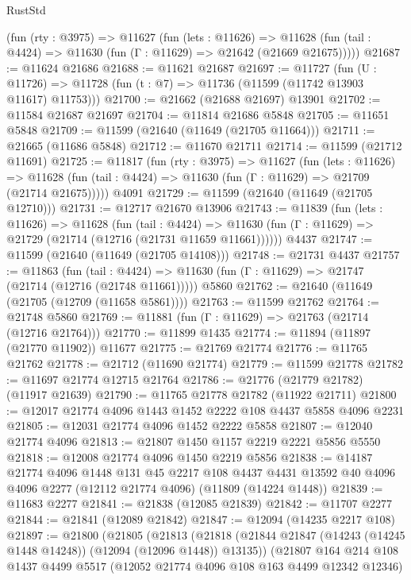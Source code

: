 \begin{lexlean}{RustStd}
\begin{coremodule}
    (fun (rty : @3975) =>
    @11627
      (fun (lets : @11626) =>
      @11628 (fun (tail : @4424) => @11630 (fun (Γ : @11629) => @21642 (@21669 @21675)))))
@21687 := @11624 @21686
@21688 := @11621 @21687
@21697 := @11727
    (fun (U : @11726) => @11728 (fun (t : @7) => @11736 (@11599 (@11742 @13903 @11617) @11753)))
@21700 := @21662 (@21688 @21697) @13901
@21702 := @11584 @21687 @21697
@21704 := @11814 @21686 @5848
@21705 := @11651 @5848
@21709 := @11599 (@21640 (@11649 (@21705 @11664)))
@21711 := @21665 (@11686 @5848)
@21712 := @11670 @21711
@21714 := @11599 (@21712 @11691)
@21725 := @11817
    (fun (rty : @3975) =>
    @11627
      (fun (lets : @11626) =>
      @11628 (fun (tail : @4424) => @11630 (fun (Γ : @11629) => @21709 (@21714 @21675)))))
    @4091
@21729 := @11599 (@21640 (@11649 (@21705 @12710)))
@21731 := @12717 @21670 @13906
@21743 := @11839
    (fun (lets : @11626) =>
    @11628
      (fun (tail : @4424) =>
      @11630 (fun (Γ : @11629) => @21729 (@21714 (@12716 (@21731 @11659 @11661))))))
    @4437
@21747 := @11599 (@21640 (@11649 (@21705 @14108)))
@21748 := @21731 @4437
@21757 := @11863
    (fun (tail : @4424) => @11630 (fun (Γ : @11629) => @21747 (@21714 (@12716 (@21748 @11661)))))
    @5860
@21762 := @21640 (@11649 (@21705 (@12709 (@11658 @5861))))
@21763 := @11599 @21762
@21764 := @21748 @5860
@21769 := @11881 (fun (Γ : @11629) => @21763 (@21714 (@12716 @21764)))
@21770 := @11899 @1435
@21774 := @11894 (@11897 (@21770 @11902)) @11677
@21775 := @21769 @21774
@21776 := @11765 @21762
@21778 := @21712 (@11690 @21774)
@21779 := @11599 @21778
@21782 := @11697 @21774 @12715 @21764
@21786 := @21776 (@21779 @21782) (@11917 @21639)
@21790 := @11765 @21778 @21782 (@11922 @21711)
@21800 := @12017 @21774 @4096 @1443 @1452 @2222 @108 @4437 @5858 @4096 @2231
@21805 := @12031 @21774 @4096 @1452 @2222 @5858
@21807 := @12040 @21774 @4096
@21813 := @21807 @1450 @1157 @2219 @2221 @5856 @5550
@21818 := @12008 @21774 @4096 @1450 @2219 @5856
@21838 := @14187
    @21774
    @4096
    @1448
    @131
    @45
    @2217
    @108
    @4437
    @4431
    @13592
    @40
    @4096
    @4096
    @2277
    (@12112 @21774 @4096)
    (@11809 (@14224 @1448))
@21839 := @11683 @2277
@21841 := @21838 (@12085 @21839)
@21842 := @11707 @2277
@21844 := @21841 (@12089 @21842)
@21847 := @12094 (@14235 @2217 @108)
@21897 := @21800
    (@21805
      (@21813
        (@21818 (@21844 @21847 (@14243 (@14245 @1448 @14248)) (@12094 (@12096 @1448)) @13135))
        (@21807
          @164
          @214
          @108
          @1437
          @4499
          @5517
          (@12052 @21774 @4096 @108 @163 @4499 @12342 @12346)

\end{coremodule}
\end{lexlean}
